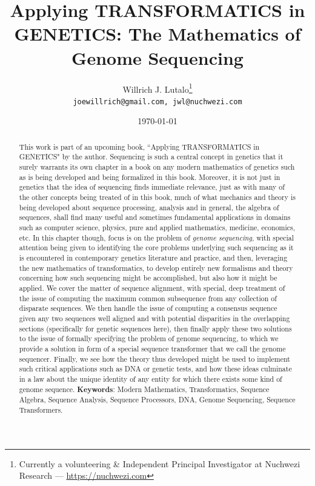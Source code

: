 \documentclass[a4paper, 18pt]{article} %
\title{Applying \textbf{TRANSFORMATICS} in GENETICS: The Mathematics of Genome Sequencing}
\author{Willrich J. Lutalo\thanks{Currently a volunteering \& Independent Principal Investigator at Nuchwezi Research --- \url{https://nuchwezi.com}}\\
\texttt{joewillrich@gmail.com, jwl@nuchwezi.com}}
\date{\today}
\begin{document}

%


%


\maketitle

\begin{abstract}
This work is part of an upcoming book, ``Applying TRANSFORMATICS in GENETICS" by the author. Sequencing is such a central concept in genetics that it surely warrants its own chapter in a book on any modern mathematics of genetics such as is being developed and being formalized in this book. Moreover, it is not just in genetics that the idea of sequencing finds immediate relevance, just as with many of the other concepts being treated of in this book, much of what mechanics and theory is being developed about sequence processing, analysis and in general, the algebra of sequences, shall find many useful and sometimes fundamental applications in domains such as computer science, physics, pure and applied mathematics, medicine, economics, etc. In this chapter though, focus is on the problem of \textit{genome sequencing}, with special attention being given to identifying the core problems underlying such sequencing as it is encountered in contemporary genetics literature and practice, and then, leveraging the new mathematics of transformatics\cite{Lutalo2025_transformatics_thesis}, to develop entirely new formalisms and theory concerning how such sequencing might be accomplished, but also how it might be applied. We cover the matter of sequence alignment, with special, deep treatment of the issue of computing the maximum common subsequence from any collection of disparate sequences. We then handle the issue of computing a consensus sequence given any two sequences well aligned and with potential disparities in the overlapping sections (specifically for genetic sequences here), then finally apply these two solutions to the issue of formally specifying the problem of genome sequencing, to which we provide a solution in form of a special sequence transformer that we call the genome sequencer. Finally, we see how the theory thus developed might be used to implement such critical applications such as DNA or genetic tests, and how these ideas culminate in a law about the unique identity of any entity for which there exists some kind of genome sequence.
 \newline\newline
     \textbf{Keywords}: Modern Mathematics, Transformatics, Sequence Algebra, Sequence Analysis, Sequence Processors, DNA, Genome Sequencing, Sequence Transformers.
\end{abstract}
\end{document}
